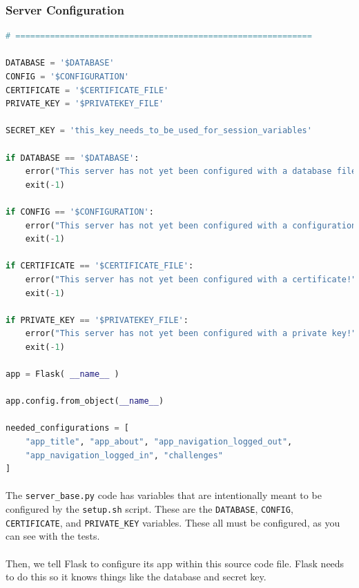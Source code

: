 \documentclass[11pt]{article}
\begin{document}
	\newpage

	\subsubsection{Server Configuration}

\begin{lstlisting}[language=Python]
# ============================================================

DATABASE = '$DATABASE'
CONFIG = '$CONFIGURATION'
CERTIFICATE = '$CERTIFICATE_FILE'
PRIVATE_KEY = '$PRIVATEKEY_FILE'

SECRET_KEY = 'this_key_needs_to_be_used_for_session_variables'

if DATABASE == '$DATABASE':
	error("This server has not yet been configured with a database file!")
	exit(-1)

if CONFIG == '$CONFIGURATION':
	error("This server has not yet been configured with a configuration file!")
	exit(-1)

if CERTIFICATE == '$CERTIFICATE_FILE':
	error("This server has not yet been configured with a certificate!")
	exit(-1)

if PRIVATE_KEY == '$PRIVATEKEY_FILE':
	error("This server has not yet been configured with a private key!")
	exit(-1)

app = Flask( __name__ )

app.config.from_object(__name__)

needed_configurations = [
	"app_title", "app_about", "app_navigation_logged_out",
	"app_navigation_logged_in", "challenges"
]
\end{lstlisting}
	
	\paragraph{} The \texttt{server\_base.py} code has variables that are intentionally meant to be configured by the \texttt{setup.sh} script. These are the \texttt{DATABASE}, \texttt{CONFIG},  \texttt{CERTIFICATE}, and \texttt{PRIVATE\_KEY} variables. These all must be configured, as you can see with the tests.

	\paragraph{} Then, we tell Flask to configure its app within this source code file. Flask needs to do this so it knows things like the database and secret key.

	\newpage
\end{document}
